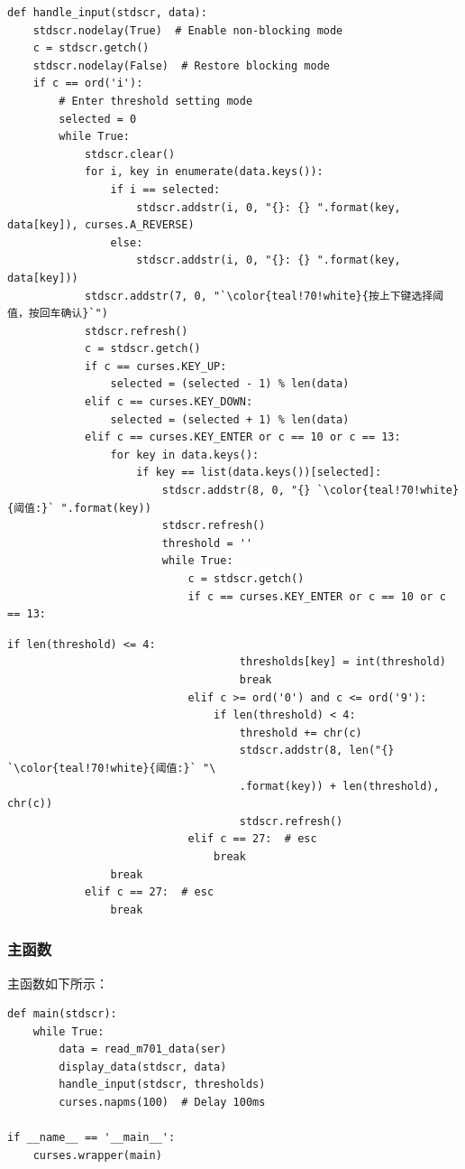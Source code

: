\documentclass[12pt,hyperref,a4paper,UTF8]{ctexart}
\begin{document}
\begin{lstlisting}[style=Pythonstyle, name=handle_input.py]
    def handle_input(stdscr, data):
    stdscr.nodelay(True)  # Enable non-blocking mode
    c = stdscr.getch()
    stdscr.nodelay(False)  # Restore blocking mode
    if c == ord('i'):
        # Enter threshold setting mode
        selected = 0
        while True:
            stdscr.clear()
            for i, key in enumerate(data.keys()):
                if i == selected:
                    stdscr.addstr(i, 0, "{}: {} ".format(key, data[key]), curses.A_REVERSE)
                else:
                    stdscr.addstr(i, 0, "{}: {} ".format(key, data[key]))
            stdscr.addstr(7, 0, "`\color{teal!70!white}{按上下键选择阈值，按回车确认}`")
            stdscr.refresh()
            c = stdscr.getch()
            if c == curses.KEY_UP:
                selected = (selected - 1) % len(data)
            elif c == curses.KEY_DOWN:
                selected = (selected + 1) % len(data)
            elif c == curses.KEY_ENTER or c == 10 or c == 13:
                for key in data.keys():
                    if key == list(data.keys())[selected]:
                        stdscr.addstr(8, 0, "{} `\color{teal!70!white}{阈值:}` ".format(key))
                        stdscr.refresh()
                        threshold = ''
                        while True:
                            c = stdscr.getch()
                            if c == curses.KEY_ENTER or c == 10 or c == 13:
\end{lstlisting}
\newpage
\begin{lstlisting}[style=Pythonstyle, name=handle_input.py]
                                if len(threshold) <= 4:
                                    thresholds[key] = int(threshold)
                                    break
                            elif c >= ord('0') and c <= ord('9'):
                                if len(threshold) < 4:
                                    threshold += chr(c)
                                    stdscr.addstr(8, len("{} `\color{teal!70!white}{阈值:}` "\
                                    .format(key)) + len(threshold), chr(c))
                                    stdscr.refresh()
                            elif c == 27:  # esc
                                break
                break
            elif c == 27:  # esc
                break
\end{lstlisting}

\subsubsection{主函数}
主函数如下所示：
\begin{lstlisting}[style=Pythonstyle, name=main.py]
    def main(stdscr):
    while True:
        data = read_m701_data(ser)
        display_data(stdscr, data)
        handle_input(stdscr, thresholds)
        curses.napms(100)  # Delay 100ms

if __name__ == '__main__':
    curses.wrapper(main)
\end{lstlisting}
\end{document}
